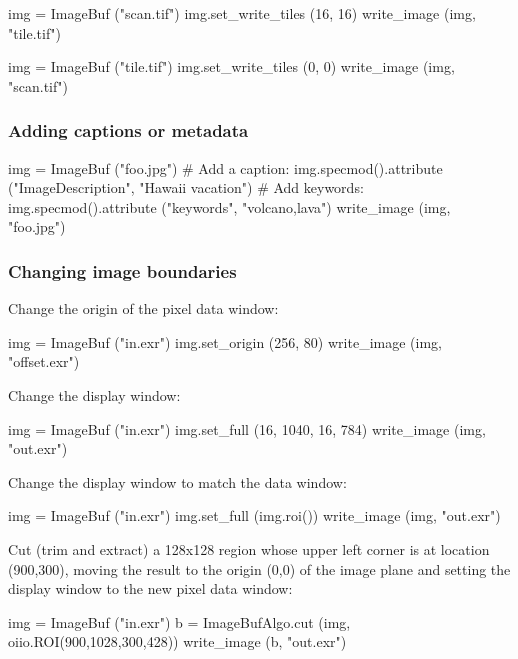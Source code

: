\begin{code}
    img = ImageBuf ("scan.tif")
    img.set_write_tiles (16, 16)
    write_image (img, "tile.tif")

    img = ImageBuf ("tile.tif")
    img.set_write_tiles (0, 0)
    write_image (img, "scan.tif")
\end{code}


\subsubsection*{Adding captions or metadata}

\begin{code}
    img = ImageBuf ("foo.jpg")
    # Add a caption:
    img.specmod().attribute ("ImageDescription", "Hawaii vacation")
    # Add keywords:
    img.specmod().attribute ("keywords", "volcano,lava")
    write_image (img, "foo.jpg")
\end{code}


\subsubsection*{Changing image boundaries}

\noindent Change the origin of the pixel data window:
\begin{code}
    img = ImageBuf ("in.exr")
    img.set_origin (256, 80)
    write_image (img, "offset.exr")
\end{code}

\noindent Change the display window:
\begin{code}
    img = ImageBuf ("in.exr")
    img.set_full (16, 1040, 16, 784)
    write_image (img, "out.exr")
\end{code}

\noindent Change the display window to match the data window:
\begin{code}
    img = ImageBuf ("in.exr")
    img.set_full (img.roi())
    write_image (img, "out.exr")
\end{code}

\noindent Cut (trim and extract) a 128x128 region whose upper left corner
is at location (900,300), moving the result to the origin (0,0) of the image
plane and setting the display window to the new pixel data window:
\begin{code}
    img = ImageBuf ("in.exr")
    b = ImageBufAlgo.cut (img, oiio.ROI(900,1028,300,428))
    write_image (b, "out.exr")
\end{code}



